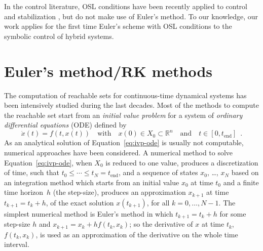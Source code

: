 In the control literature, OSL conditions
have been recently applied to control and stabilization 
\cite{Abbaszadeh2010,Cai2015},
but do not make use of Euler's method.
%
To our knowledge, our work applies for the first time Euler's scheme
with OSL conditions to the symbolic
control of hybrid systems.


\section{Euler's method/RK methods}


The computation of reachable sets for continuous-time dynamical
systems has been intensively studied during the last decades.
Most of the methods
to compute the reachable set start from an \textit{initial value
  problem} for a system of \textit{ordinary differential equations} (ODE) defined
by
\begin{equation}
  \label{eq:ivp-ode}
  \dot{x}(t)=f(t,x(t))
  \quad\text{with}\quad x(0)\in X_0 \subset \mathbb{R}^n
  \quad\text{and}\quad t\in[0,t_{\text{end}}]\enspace.
\end{equation}
As an analytical solution of
Equation~\eqref{eq:ivp-ode} is usually not computable, numerical
approaches have been considered.
%
A numerical method to solve Equation~\eqref{eq:ivp-ode}, when $X_0$ is
reduced to one value, produces a discretization of time, such that
$t_0 \leqslant \cdots \leqslant t_N = t_{\text{end}}$, and a sequence
of states $x_0$, \dots, $x_{N}$ based on an integration method
which starts from an initial value $x_0$ at time
$t_0$ and a finite time horizon~$h$ (the step-size), produces an
approximation $x_{k+1}$ at time $t_{k+1} = t_k + h$, of the exact
solution $x(t_{k+1})$,
for all $k = 0,\dots,N-1$. The simplest numerical
method is Euler's method in which $t_{k+1} = t_k + h$ for some
step-size $h$ and $x_{k+1} = x_k + h f(t_k,x_k)$; so the derivative of
$x$ at time $t_k$, $f(t_k, x_k)$, is used as an approximation of the
derivative on the whole time interval.



